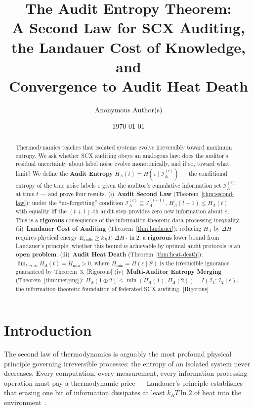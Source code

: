 \documentclass[12pt,a4paper]{article}
\title{\bfseries The Audit Entropy Theorem:\\
A Second Law for SCX Auditing,\\
the Landauer Cost of Knowledge, and\\
Convergence to Audit Heat Death}
\author{Anonymous Author(s)}
\date{\today}
\newcommand{\rigorous}{\textcolor{green!50!black}{\small\textsf{[Rigorous]}}}
\newcommand{\cI}{\mathcal{I}}
\begin{document}
\maketitle

\begin{abstract}
Thermodynamics teaches that isolated systems evolve irreversibly toward maximum
entropy.  We ask whether SCX auditing obeys an analogous law: does the
auditor's residual uncertainty about label noise evolve monotonically, and if
so, toward what limit?  We define the \textbf{Audit Entropy}
$H_A(t)=H(\varepsilon\mid\cI_A^{(t)})$ — the conditional entropy of the true
noise labels $\varepsilon$ given the auditor's cumulative information set
$\cI_A^{(t)}$ at time $t$ — and prove four results.  (i)~\textbf{Audit Second
Law} (Theorem~\ref{thm:second-law}): under the ``no-forgetting'' condition
$\cI_A^{(t)}\subseteq\cI_A^{(t+1)}$, $H_A(t+1)\leq H_A(t)$ with equality iff
the $(t+1)$-th audit step provides zero new information about $\varepsilon$.
This is a \textbf{rigorous} consequence of the information-theoretic data
processing inequality.  (ii)~\textbf{Landauer Cost of Auditing}
(Theorem~\ref{thm:landauer}): reducing $H_A$ by $\Delta H$ requires physical
energy $E_{\mathrm{audit}}\geq k_B T\cdot\Delta H\cdot\ln2$, a \textbf{rigorous}
lower bound from Landauer's principle; whether this bound is achievable by
optimal audit protocols is an \textbf{open problem}.  (iii)~\textbf{Audit Heat
Death} (Theorem~\ref{thm:heat-death}):
$\lim_{t\to\infty}H_A(t)=H_{\min}>0$, where $H_{\min}=H(\varepsilon\mid S)$ is
the irreducible ignorance guaranteed by Theorem~3.  \rigorous
(iv)~\textbf{Multi-Auditor Entropy Merging} (Theorem~\ref{thm:merging}):
$H_A(1\oplus2)\leq\min(H_A(1),H_A(2))-I(\cI_1;\cI_2\mid\varepsilon)$, the
information-theoretic foundation of federated SCX auditing.  \rigorous
\end{abstract}

\section{Introduction}

The second law of thermodynamics is arguably the most profound physical
principle governing irreversible processes: the entropy of an isolated system
never decreases.  Every computation, every measurement, every information
processing operation must pay a thermodynamic price — Landauer's principle
establishes that erasing one bit of information dissipates at least
$k_B T\ln 2$ of heat into the environment~\citep{landauer1961irreversibility}.
\end{document}
